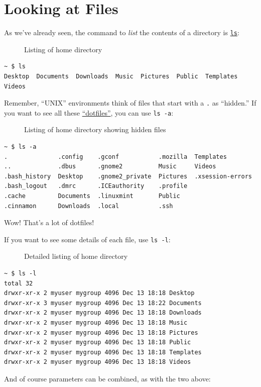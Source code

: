 \documentclass[10pt,]{book}
\numberwithin{figure}{chapter}
\DeclareRobustCommand{\drcap}[1]{\begin{figure}[H]\caption{#1}\end{figure}}
\DeclareRobustCommand{\drcmd}[1]{\index{Commands!#1}}
\begin{document}
\section{Looking at Files}\label{looking-at-files}

As we've already seen, the command to \emph{list} the contents of a
directory is
\href{http://linux.die.net/man/1/ls}{\texttt{ls}}\drcmd{ls}:

\drcap{Listing of home directory}

\begin{verbatim}
~ $ ls
Desktop  Documents  Downloads  Music  Pictures  Public  Templates  Videos
\end{verbatim}

Remember, ``UNIX'' environments think of files that start with a
\texttt{.} as ``hidden.'' If you want to see all these
\href{https://en.wikipedia.org/wiki/Hidden_file_and_hidden_directory\#Unix_and_Unix-like_environments}{``dotfiles''},
you can use \texttt{ls -a}:

\drcap{Listing of home directory showing hidden files}

\begin{verbatim}
~ $ ls -a
.              .config    .gconf           .mozilla  Templates
..             .dbus      .gnome2          Music     Videos
.bash_history  Desktop    .gnome2_private  Pictures  .xsession-errors
.bash_logout   .dmrc      .ICEauthority    .profile
.cache         Documents  .linuxmint       Public
.cinnamon      Downloads  .local           .ssh
\end{verbatim}

Wow! That's a lot of dotfiles!

If you want to see some details of each file, use \texttt{ls -l}:

\drcap{Detailed listing of home directory}

\begin{verbatim}
~ $ ls -l
total 32
drwxr-xr-x 2 myuser mygroup 4096 Dec 13 18:18 Desktop
drwxr-xr-x 3 myuser mygroup 4096 Dec 13 18:22 Documents
drwxr-xr-x 2 myuser mygroup 4096 Dec 13 18:18 Downloads
drwxr-xr-x 2 myuser mygroup 4096 Dec 13 18:18 Music
drwxr-xr-x 2 myuser mygroup 4096 Dec 13 18:18 Pictures
drwxr-xr-x 2 myuser mygroup 4096 Dec 13 18:18 Public
drwxr-xr-x 2 myuser mygroup 4096 Dec 13 18:18 Templates
drwxr-xr-x 2 myuser mygroup 4096 Dec 13 18:18 Videos
\end{verbatim}

And of course parameters can be combined, as with the two above:
\end{document}
